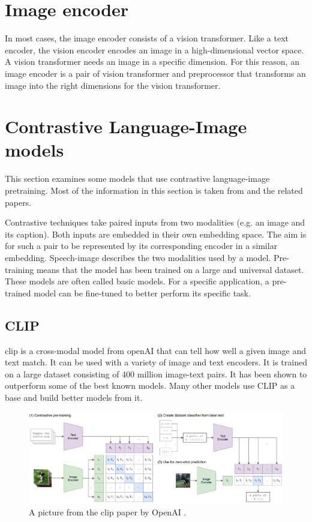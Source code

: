     \section{Image encoder}
    In most cases, the image encoder consists of a vision transformer\cite{Vis_N_Grams}.
    Like a text encoder, the vision encoder encodes an image in a high-dimensional vector space.
    A vision transformer needs an image in a specific dimension.
    For this reason, an image encoder is a pair of vision transformer and preprocessor that transforms an image into the right dimensions for the vision transformer.

    
    \section{Contrastive Language-Image models
        \label{section:languageimagemodels}}
        This section examines some models that use contrastive language-image pretraining.
        Most of the information in this section is taken from \cite{cliplikeweb} and the related papers.

        Contrastive techniques take paired inputs from two modalities (e.g. an image and its caption).
        Both inputs are embedded in their own embedding space.
        The aim is for such a pair to be represented by its corresponding encoder in a similar embedding.
        Speech-image describes the two modalities used by a model.
        Pre-training means that the model has been trained on a large and universal dataset.
        These models are often called basic models.
        For a specific application, a pre-trained model can be fine-tuned to better perform its specific task.

        \subsection{CLIP
            \label{section:clip}}
        \acrfull{clip} \cite{clip} is a cross-modal model from openAI\cite{openai} that can tell how well a given image and text match.
        It can be used with a variety of image and text encoders.
        It is trained on a large dataset consisting of 400 million image-text pairs.
        It has been shown to outperform some of the best known models.
        Many other models use CLIP as a base and build better models from it.

        \begin{figure}
            \centering
            \includegraphics[width=\textwidth]{Images/crossmodalnetworks/OpenAICLIP.png}
            \caption{A picture from the \acrshort{clip} paper by OpenAI \cite{clip}.}
            \label{fig:crossmodalnetworks:openaiclip}
        \end{figure}

